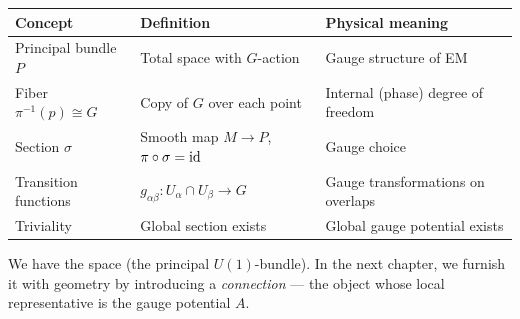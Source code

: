 \begin{table}[h]
\centering
\renewcommand{\arraystretch}{1.4}
\begin{tabular}{lll}
\toprule
\textbf{Concept} & \textbf{Definition} & \textbf{Physical meaning} \\
\midrule
Principal bundle $P$ & Total space with $G$-action & Gauge structure of EM \\
Fiber $\pi^{-1}(p) \cong G$ & Copy of $G$ over each point & Internal (phase) degree of freedom \\
Section $\sigma$ & Smooth map $M \to P$, $\pi\circ\sigma = \mathrm{id}$ & Gauge choice \\
Transition functions & $g_{\alpha\beta}: U_\alpha\cap U_\beta \to G$ & Gauge transformations on overlaps \\
Triviality & Global section exists & Global gauge potential exists \\
\bottomrule
\end{tabular}
\end{table}

We have the space (the principal $U(1)$-bundle). In the next chapter, we furnish it with geometry by introducing a \emph{connection} --- the object whose local representative is the gauge potential $A$.
